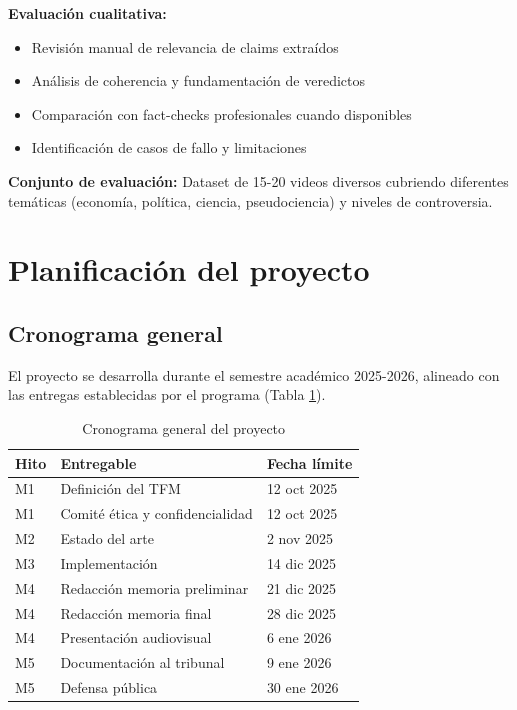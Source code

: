 \documentclass[12pt,a4paper]{article}
\begin{document}
\textbf{Evaluación cualitativa:}
\begin{itemize}
    \item Revisión manual de relevancia de claims extraídos
    \item Análisis de coherencia y fundamentación de veredictos
    \item Comparación con fact-checks profesionales cuando disponibles
    \item Identificación de casos de fallo y limitaciones
\end{itemize}

\textbf{Conjunto de evaluación:} Dataset de 15-20 videos diversos cubriendo diferentes temáticas (economía, política, ciencia, pseudociencia) y niveles de controversia.

\section{Planificación del proyecto}

\subsection{Cronograma general}

El proyecto se desarrolla durante el semestre académico 2025-2026, alineado con las entregas establecidas por el programa (Tabla \ref{tab:cronograma}).

\begin{table}[h]
\centering
\begin{tabular}{|l|l|l|}
\hline
\textbf{Hito} & \textbf{Entregable} & \textbf{Fecha límite} \\
\hline
M1 & Definición del TFM & 12 oct 2025 \\
M1 & Comité ética y confidencialidad & 12 oct 2025\\
M2 & Estado del arte & 2 nov 2025\\
M3 & Implementación & 14 dic 2025\\
M4 & Redacción memoria preliminar & 21 dic 2025\\
M4 & Redacción memoria final & 28 dic 2025\\
M4 & Presentación audiovisual & 6 ene 2026\\
M5 & Documentación al tribunal & 9 ene 2026\\
M5 & Defensa pública & 30 ene 2026\\
\hline
\end{tabular}
\caption{Cronograma general del proyecto}
\label{tab:cronograma}
\end{table}
\end{document}
